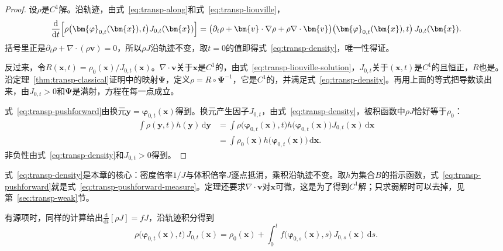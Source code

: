\begin{proof}
设$\rho$是$C^{1}$解。沿轨迹，由式~\eqref{eq:transp-along}和式~\eqref{eq:transp-liouville}，
\[
  \frac{\mathrm{d}}{\mathrm{d}t}\Bigl[\rho\bigl(\bm{\varphi}_{0,t}(\bm{x}),t\bigr)J_{0,t}(\bm{x})\Bigr]
  =\bigl(\partial_t\rho+\bm{v}\cdot\nabla\rho+\rho\nabla\cdot\bm{v}\bigr)\bigl(\bm{\varphi}_{0,t}(\bm{x}),t\bigr)\,J_{0,t}(\bm{x}).
\]
括号里正是$\partial_t\rho+\nabla\cdot(\rho\bm{v})=0$，所以$\rho J$沿轨迹不变，取$t=0$的值即得式~\eqref{eq:transp-density}，唯一性得证。

反过来，令$R(\bm{x},t)=\rho_0(\bm{x})/J_{0,t}(\bm{x})$。$\nabla\cdot\bm{v}$关于$\bm{x}$是$C^{1}$的，由式~\eqref{eq:transp-liouville-solution}，$J_{0,t}$关于$(\bm{x},t)$是$C^{1}$的且恒正，$R$也是。沿定理~\ref{thm:transp-classical}证明中的映射$\bm{\Psi}$，定义$\rho=R\circ\bm{\Psi}^{-1}$，它是$C^{1}$的，并满足式~\eqref{eq:transp-density}。再用上面的等式把导数读出来，由$J_{0,t}>0$和$\bm{\Psi}$是满射，方程在每一点成立。

式~\eqref{eq:transp-pushforward}由换元$\bm{y}=\bm{\varphi}_{0,t}(\bm{x})$得到。换元产生因子$J_{0,t}$，由式~\eqref{eq:transp-density}，被积函数中$\rho J$恰好等于$\rho_0$：
\[
  \begin{aligned}
  \int\rho(\bm{y},t)h(\bm{y})\,\mathrm{d}\bm{y}
  &=\int\rho\bigl(\bm{\varphi}_{0,t}(\bm{x}),t\bigr)h\bigl(\bm{\varphi}_{0,t}(\bm{x})\bigr)J_{0,t}(\bm{x})\,\mathrm{d}\bm{x}\\
  &=\int\rho_0(\bm{x})h\bigl(\bm{\varphi}_{0,t}(\bm{x})\bigr)\,\mathrm{d}\bm{x}.
  \end{aligned}
\]
非负性由式~\eqref{eq:transp-density}和$J_{0,t}>0$得到。
\end{proof}

式~\eqref{eq:transp-density}是本章的核心：密度倍率$1/J$与体积倍率$J$逐点抵消，乘积沿轨迹不变。取$h$为集合$B$的指示函数，式~\eqref{eq:transp-pushforward}就是式~\eqref{eq:transp-pushforward-measure}。定理还要求$\nabla\cdot\bm{v}$对$\bm{x}$可微，这是为了得到$C^{1}$解；只求弱解时可以去掉，见第~\ref{sec:transp-weak}节。

有源项时，同样的计算给出$\frac{\mathrm{d}}{\mathrm{d}t}[\rho J]=fJ$，沿轨迹积分得到
\begin{equation}
  \rho\bigl(\bm{\varphi}_{0,t}(\bm{x}),t\bigr)\,J_{0,t}(\bm{x})
  =\rho_0(\bm{x})+\int_0^{t}f\bigl(\bm{\varphi}_{0,s}(\bm{x}),s\bigr)\,J_{0,s}(\bm{x})\,\mathrm{d}s.
  \label{eq:transp-density-source}
\end{equation}


